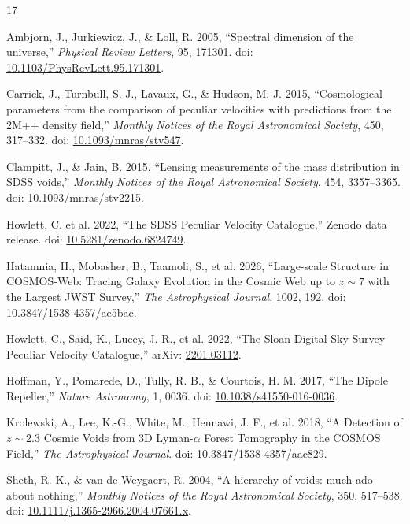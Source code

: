 \documentclass[11pt,a4paper]{article}
\begin{document}
\begin{thebibliography}{17}

Ambjorn, J., Jurkiewicz, J., \& Loll, R. 2005,
``Spectral dimension of the universe,''
\emph{Physical Review Letters}, 95, 171301.
doi: \href{https://doi.org/10.1103/PhysRevLett.95.171301}{10.1103/PhysRevLett.95.171301}.

Carrick, J., Turnbull, S. J., Lavaux, G., \& Hudson, M. J. 2015,
``Cosmological parameters from the comparison of peculiar velocities with predictions from the 2M++ density field,''
\emph{Monthly Notices of the Royal Astronomical Society}, 450, 317--332.
doi: \href{https://doi.org/10.1093/mnras/stv547}{10.1093/mnras/stv547}.

Clampitt, J., \& Jain, B. 2015,
``Lensing measurements of the mass distribution in SDSS voids,''
\emph{Monthly Notices of the Royal Astronomical Society}, 454, 3357--3365.
doi: \href{https://doi.org/10.1093/mnras/stv2215}{10.1093/mnras/stv2215}.

Howlett, C. et al. 2022,
``The SDSS Peculiar Velocity Catalogue,''
Zenodo data release.
doi: \href{https://doi.org/10.5281/zenodo.6824749}{10.5281/zenodo.6824749}.

Hatamnia, H., Mobasher, B., Taamoli, S., et al. 2026,
``Large-scale Structure in COSMOS-Web: Tracing Galaxy Evolution in the Cosmic Web up to $z\sim7$ with the Largest JWST Survey,''
\emph{The Astrophysical Journal}, 1002, 192.
doi: \href{https://doi.org/10.3847/1538-4357/ae5bac}{10.3847/1538-4357/ae5bac}.

Howlett, C., Said, K., Lucey, J. R., et al. 2022,
``The Sloan Digital Sky Survey Peculiar Velocity Catalogue,''
arXiv: \href{https://arxiv.org/abs/2201.03112}{2201.03112}.

Hoffman, Y., Pomarede, D., Tully, R. B., \& Courtois, H. M. 2017,
``The Dipole Repeller,''
\emph{Nature Astronomy}, 1, 0036.
doi: \href{https://doi.org/10.1038/s41550-016-0036}{10.1038/s41550-016-0036}.

Krolewski, A., Lee, K.-G., White, M., Hennawi, J. F., et al. 2018,
``A Detection of $z\sim2.3$ Cosmic Voids from 3D Lyman-$\alpha$ Forest Tomography in the COSMOS Field,''
\emph{The Astrophysical Journal}.
doi: \href{https://doi.org/10.3847/1538-4357/aac829}{10.3847/1538-4357/aac829}.

Sheth, R. K., \& van de Weygaert, R. 2004,
``A hierarchy of voids: much ado about nothing,''
\emph{Monthly Notices of the Royal Astronomical Society}, 350, 517--538.
doi: \href{https://doi.org/10.1111/j.1365-2966.2004.07661.x}{10.1111/j.1365-2966.2004.07661.x}.


\end{thebibliography}
\end{document}
